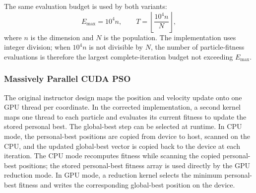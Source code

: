 \documentclass[conference]{IEEEtran}
\begin{document}
The same evaluation budget is used by both variants:
\begin{equation}
  E_{\max}=10^4 n,\qquad
  T=\left\lfloor\frac{10^4 n}{N}\right\rfloor,
\end{equation}
where $n$ is the dimension and $N$ is the population. The implementation uses
integer division; when $10^4n$ is not divisible by $N$, the number of
particle-fitness evaluations is therefore the largest complete-iteration
budget not exceeding $E_{\max}$.

\subsubsection{Massively Parallel CUDA PSO}
\label{sec:pso-gpu}
The original instructor design maps the position and velocity update onto
one GPU thread per coordinate. In the corrected implementation, a second
kernel maps one thread to each particle and evaluates its current fitness to
update the stored personal best. The global-best step can be selected at
runtime. In CPU mode, the personal-best positions are copied from device to
host, scanned on the CPU, and the updated global-best vector is copied back to
the device at each iteration. The CPU mode recomputes fitness while scanning
the copied personal-best positions; the stored personal-best fitness array
is used directly by the GPU reduction mode. In GPU mode, a reduction kernel
selects the minimum personal-best fitness and writes the corresponding
global-best position on the device.
\end{document}
